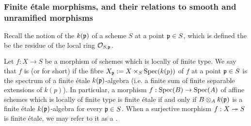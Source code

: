 \subsubsection{Finite \'etale morphisms, and their relations to smooth and unramified morphisms}
\label{subsubsec:2_4_3_sm_nr_et}
Recall the notion of the  $k(\mathfrak{p})$ of a scheme $S$ at a point $\mathfrak{p} \in S$, which is defined the be the residue of the local ring $\mathcal{O}_{S, \mathfrak{p}}$. 


\begin{defn}
	Let $f: X \to S$ be a morphism of schemes which is locally of finite type. We say that $f$ is  (or  for short) if the fibre $X_{\mathfrak{p}} := X \times_{S} \mathrm{Spec}(k(p))$ of $f$ at a point $\mathfrak{p} \in S$ is the spectrum of a finite \'etale $k(\mathfrak{p})$-algebra (i.e. a finite sum of finite separable extensions of $k(p)$). In particular, a morphism $f : \mathrm{Spec}(B) \to \mathrm{Spec}(A)$ of affine schemes which is locally of finite type is finite \'etale if and only if $B \otimes_{A} k(\mathfrak{p})$ is a finite \'etale $k(\mathfrak{p})$-algebra for every $\mathfrak{p} \in S$. When a surjective morphism $f : X \twoheadrightarrow S$ is finite \'etale, we may refer to it as a .
\end{defn}


